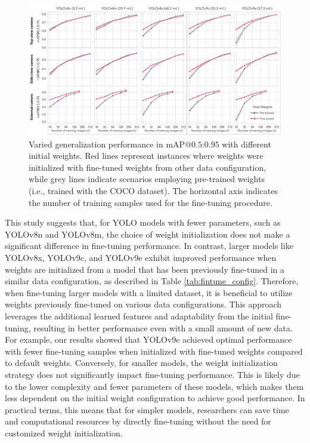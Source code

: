 \begin{figure}[h]
    \centering
    \includegraphics[width=1\textwidth]{figure_5.jpg}
    \caption{Varied generalization performance in $\text{mAP@{0.5:0.95}}$ with different initial weights. Red lines represent instances where weights were initialized with fine-tuned weights from other data configuration, while grey lines indicate scenarios employing pre-trained weights (i.e., trained with the COCO dataset). The horizontal axis indicates the number of training samples used for the fine-tuning procedure.}
    \label{fig:finetune}
\end{figure}

This study suggests that, for YOLO models with fewer parameters, such as YOLOv8n and YOLOv8m, the choice of weight initialization does not make a significant difference in fine-tuning performance. In contrast, larger models like YOLOv8x, YOLOv9c, and YOLOv9e exhibit improved performance when weights are initialized from a model that has been previously fine-tuned in a similar data configuration, as described in Table \ref{tab:fintune_config}. Therefore, when fine-tuning larger models with a limited dataset, it is beneficial to utilize weights previously fine-tuned on various data configurations. This approach leverages the additional learned features and adaptability from the initial fine-tuning, resulting in better performance even with a small amount of new data. For example, our results showed that YOLOv9e achieved optimal performance with fewer fine-tuning samples when initialized with fine-tuned weights compared to default weights. Conversely, for smaller models, the weight initialization strategy does not significantly impact fine-tuning performance. This is likely due to the lower complexity and fewer parameters of these models, which makes them less dependent on the initial weight configuration to achieve good performance. In practical terms, this means that for simpler models, researchers can save time and computational resources by directly fine-tuning without the need for customized weight initialization.

